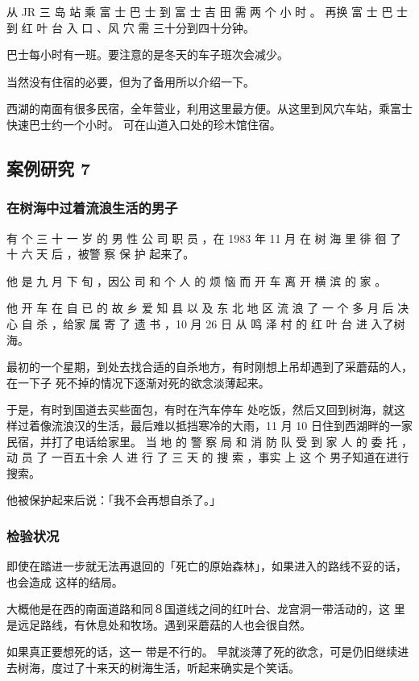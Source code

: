 \documentclass[UTF8]{ctexart}
\begin{document}
从 JR  三 岛 站 乘 富 士 巴 士 到 富 士 吉 田 需 两 个 小 时 。
再换 富 士 巴 士 到 红 叶 台 入 口 、风 穴 需 三十分到四十分钟。

巴士每小时有一班。要注意的是冬天的车子班次会减少。

当然没有住宿的必要，但为了备用所以介绍一下。

西湖的南面有很多民宿，全年营业，利用这里最方便。从这里到风穴车站，乘富士快速巴士约一个小时。
可在山道入口处的珍木馆住宿。



\subsection{案例研究 7}
\subsubsection*{在树海中过着流浪生活的男子}

有 个 三 十 一 岁 的 男 性 公 司 职 员 ，在 1983 年 11 月 在 树 海 里 徘 徊 了 十 六 天 后 ，被警 察 保 护 起来了。

他 是 九 月 下 旬 ，因公 司 和 个 人 的 烦 恼 而 开 车 离 开 横 滨 的 家 。

他 开 车 在 自 已 的 故 乡 爱 知 县 以 及 东 北 地 区 流 浪 了 一 个 多 月 后 决 心 自 杀 ，给家 属 寄 了 遗 书 ，10 月 26 日 从 鸣 泽 村 的 红 叶 台 进 入了树海。

最初的一个星期，到处去找合适的自杀地方，有时刚想上吊却遇到了采蘑菇的人，在一下子 死不掉的情况下逐渐对死的欲念淡薄起来。

于是，有时到国道去买些面包，有时在汽车停车 处吃饭，然后又回到树海，就这样过着像流浪汉的生活，最后难以抵挡寒冷的大雨，11 月 10 日住到西湖畔的一家民宿，并打了电话给家里。 当 地 的 警 察 局 和 消 防 队 受 到 家 人 的 委 托 ，动 员 了 一百五十余 人 进 行 了 三 天 的 搜 索 ，事实 上 这 个 男子知道在进行搜索。

他被保护起来后说：「我不会再想自杀了。」

\subsubsection*{检验状况}

即使在踏进一步就无法再退回的「死亡的原始森林」，如果进入的路线不妥的话，也会造成
这样的结局。

大概他是在西的南面道路和同８国道线之间的红叶台、龙宫洞一带活动的，这
里是远足路线，有休息处和牧场。遇到采蘑菇的人也会很自然。

如果真正要想死的话，这一 带是不行的。 早就淡薄了死的欲念，可是仍旧继续进去树海，度过了十来天的树海生活，听起来确实是个笑话。
\end{document}
